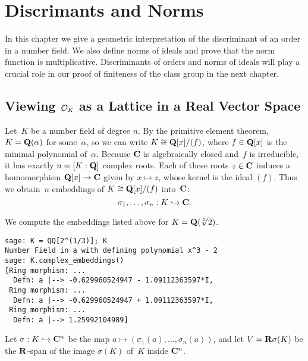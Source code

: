 \chapter{Discrimants and Norms}


In this chapter we give a geometric interpretation of the discriminant
of an order in a number field. We also define norms of ideals and
prove that the norm function is multiplicative.  Discriminants of
orders and norms of ideals will play a crucial role in our proof of
finiteness of the class group in the next chapter.  

\section{Viewing $\mathcal{O}_K$ as a Lattice in a Real Vector Space}
Let~$K$ be a number field of degree $n$.  By the primitive element
theorem, $K=\mathbf{Q}(\alpha)$ for some~$\alpha$, so we can write $K\cong
\mathbf{Q}[x]/(f)$, where $f\in\mathbf{Q}[x]$ is the minimal polynomial of~$\alpha$.
Because $\mathbf{C}$ is algebraically closed and~$f$ is irreducible, it has
exactly $n=[K:\mathbf{Q}]$ complex roots.  Each of these roots $z\in\mathbf{C}$
induces a homomorphism $\mathbf{Q}[x] \to \mathbf{C}$ given by $x\mapsto z$, whose
kernel is the ideal $(f)$.  Thus we obtain~$n$ embeddings of $K\cong
\mathbf{Q}[x]/(f)$ into~$\mathbf{C}$:
$$
  \sigma_1,\ldots, \sigma_n:K\hookrightarrow \mathbf{C}.
$$
\begin{example}
We compute the embeddings listed above for $K=\mathbf{Q}(\sqrt[3]{2})$.
\begin{verbatim}
sage: K = QQ[2^(1/3)]; K
Number Field in a with defining polynomial x^3 - 2
sage: K.complex_embeddings()
[Ring morphism: ...
  Defn: a |--> -0.629960524947 - 1.09112363597*I,
 Ring morphism: ...
  Defn: a |--> -0.629960524947 + 1.09112363597*I,
 Ring morphism: ...
  Defn: a |--> 1.25992104989]
\end{verbatim}
\end{example}


Let $\sigma:K\hookrightarrow \mathbf{C}^n$ be the map $a\mapsto
(\sigma_1(a),\ldots,\sigma_n(a))$, and let $V=\mathbf{R}\sigma(K)$ be the
$\mathbf{R}$-span of the image $\sigma(K)$ of~$K$ inside $\mathbf{C}^n$.

